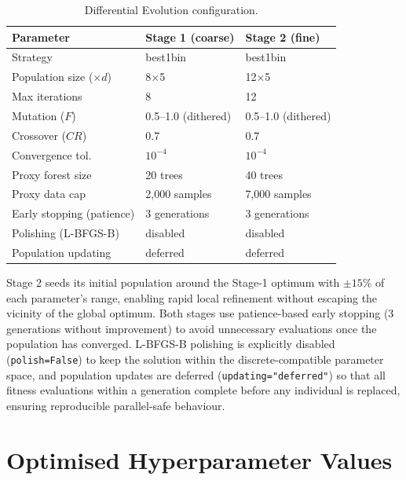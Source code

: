 \documentclass[a4paper,fleqn,longmktitle]{cas-sc}
\begin{document}
	\begin{table}[h]
		\centering
		\caption{Differential Evolution configuration.}
		\label{tab:de_config}
		\small
		\begin{tabular}{lll}
			\toprule
			\textbf{Parameter} & \textbf{Stage 1 (coarse)} & \textbf{Stage 2 (fine)} \\
			\midrule
			Strategy             & best1bin  & best1bin \\
			Population size ($\times d$) & 8$\times$5 & 12$\times$5 \\
			Max iterations       & 8         & 12 \\
			Mutation ($F$)       & 0.5--1.0 (dithered) & 0.5--1.0 (dithered) \\
			Crossover ($CR$)     & 0.7       & 0.7 \\
			Convergence tol.     & $10^{-4}$ & $10^{-4}$ \\
			Proxy forest size    & 20 trees  & 40 trees \\
			Proxy data cap       & 2{,}000 samples & 7{,}000 samples \\
			Early stopping (patience) & 3 generations & 3 generations \\
			Polishing (L-BFGS-B) & disabled  & disabled \\
			Population updating  & deferred  & deferred \\
			\bottomrule
		\end{tabular}
	\end{table}

	Stage 2 seeds its initial population around the Stage-1 optimum
	with $\pm 15\%$ of each parameter's range, enabling rapid local
	refinement without escaping the vicinity of the global optimum.
	Both stages use patience-based early stopping (3 generations without
	improvement) to avoid unnecessary evaluations once the population has
	converged.
	L-BFGS-B polishing is explicitly disabled (\texttt{polish=False}) to
	keep the solution within the discrete-compatible parameter space, and
	population updates are deferred (\texttt{updating="deferred"}) so that
	all fitness evaluations within a generation complete before any
	individual is replaced, ensuring reproducible parallel-safe behaviour.
	\vspace{100pt}
	\section{Optimised Hyperparameter Values}
	\label{app:params}
\end{document}
